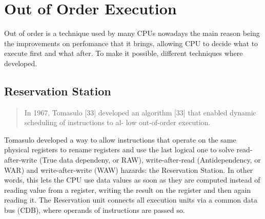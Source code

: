 \section{Out of Order Execution}
Out of order is a technique used by many CPUs nowadays the main reason being the improvements on perfomance that it brings, allowing
CPU to decide what to execute first and what after.
To make it possible, different techniques where developed.

\subsection{Reservation Station}

\begin{quote}
    In 1967, Tomasulo [33] developed an algorithm [33]
    that enabled dynamic scheduling of instructions to al-
    low out-of-order execution.
\end{quote}
Tomasulo developed a way to allow instructions that operate on the same physical registers to rename registers
and use the last logical one to solve read-after-write (True data dependeny, or RAW),
write-after-read (Antidependency, or WAR) and write-after-write (WAW) hazards: the Reservation Station.
In other words, this lets the CPU use data values as soon as they are computed instead of reading value from a register,
writing the result on the register and then again reading it.
The Reservation unit connects all execution units via a common data bus (CDB), where operands of instructions are
passed so.





